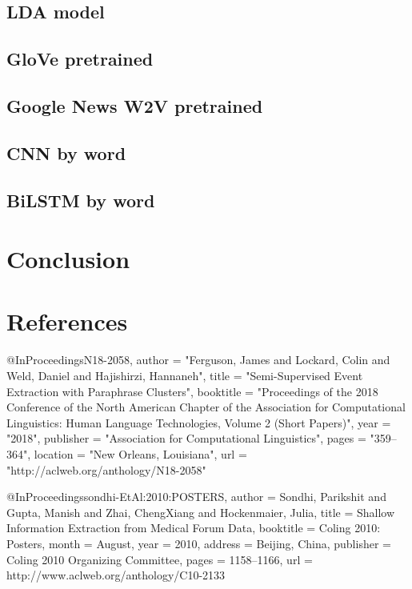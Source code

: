 \documentclass[11pt]{article}
\begin{document}
\subsection{LDA model}


\subsection{GloVe pretrained}

\subsection{Google News W2V pretrained}

\subsection{CNN by word}

\subsection{BiLSTM by word}


\section{Conclusion}




\section{References}

@InProceedings{N18-2058,
  author = 	"Ferguson, James
		and Lockard, Colin
		and Weld, Daniel
		and Hajishirzi, Hannaneh",
  title = 	"Semi-Supervised Event Extraction with Paraphrase Clusters",
  booktitle = 	"Proceedings of the 2018 Conference of the North American Chapter of the Association for Computational Linguistics: Human Language Technologies, Volume 2 (Short Papers)",
  year = 	"2018",
  publisher = 	"Association for Computational Linguistics",
  pages = 	"359--364",
  location = 	"New Orleans, Louisiana",
  url = 	"http://aclweb.org/anthology/N18-2058"
}

@InProceedings{sondhi-EtAl:2010:POSTERS,
  author    = {Sondhi, Parikshit  and  Gupta, Manish  and  Zhai, ChengXiang  and  Hockenmaier, Julia},
  title     = {Shallow Information Extraction from Medical Forum Data},
  booktitle = {Coling 2010: Posters},
  month     = {August},
  year      = {2010},
  address   = {Beijing, China},
  publisher = {Coling 2010 Organizing Committee},
  pages     = {1158--1166},
  url       = {http://www.aclweb.org/anthology/C10-2133}
}
\end{document}
